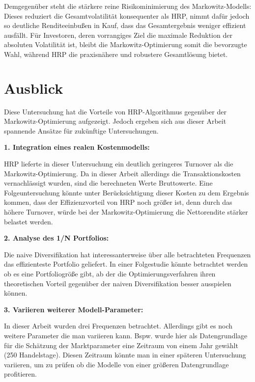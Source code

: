\documentclass[parskip=half]{scrartcl}
\begin{document}
	Demgegenüber steht die stärkere reine Risikominimierung des Markowitz-Modells: Dieses reduziert die Gesamtvolatilität konsequenter als HRP, nimmt dafür jedoch so deutliche Renditeeinbußen in Kauf, dass das Gesamtergebnis weniger effizient ausfällt. Für Investoren, deren vorrangiges Ziel die maximale Reduktion der absoluten Volatilität ist, bleibt die Markowitz-Optimierung somit die bevorzugte Wahl, während HRP die praxisnähere und robustere Gesamtlösung bietet.
	
	
	\section{Ausblick}
	
	Diese Untersuchung hat die Vorteile von HRP-Algorithmus gegenüber der Markowitz-Optimierung aufgezeigt. Jedoch ergeben sich aus dieser Arbeit spannende Ansätze für zukünftige Untersuchungen.
	
	\textbf{1. Integration eines realen Kostenmodells:}
	
	HRP lieferte in dieser Untersuchung ein deutlich geringeres Turnover als die Markowitz-Optimierung. Da in dieser Arbeit allerdings die Transaktionskosten vernachlässigt wurden, sind die berechneten Werte Bruttowerte. Eine Folgeuntersuchung könnte unter Berücksichtigung dieser Kosten zu dem Ergebnis kommen, dass der Effizienzvorteil von HRP noch größer ist, denn durch das höhere Turnover, würde bei der Markowitz-Optimierung die Nettorendite stärker belastet werden.
	
	\textbf{2. Analyse des 1/N Portfolios:}
	
	Die naive Diversifikation hat interessanterweise über alle betrachteten Frequenzen das effizienteste Portfolio geliefert. In einer Folgestudie könnte betrachtet werden ob es eine Portfoliogröße gibt, ab der die Optimierungsverfahren ihren theoretischen Vorteil gegenüber der naiven Diversifikation besser ausspielen können. 
	
	\clearpage
	
	\textbf{3. Variieren weiterer Modell-Parameter:}
	
	In dieser Arbeit wurden drei Frequenzen betrachtet. Allerdings gibt es noch weitere Parameter die man variieren kann. Bspw. wurde hier als Datengrundlage für die Schätzung der Marktparameter eine Zeitraum von einem Jahr gewählt (250 Handelstage). Diesen Zeitraum könnte man in einer späteren Untersuchung variieren, um zu prüfen ob die Modelle von einer größeren Datengrundlage profitieren.
	
\end{document}

